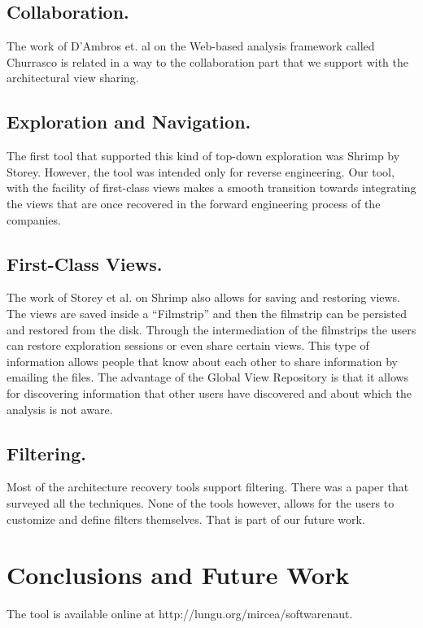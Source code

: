 \documentclass[preprint,12pt]{elsarticle}
\begin{document}
\subsection {Collaboration.} The work of D’Ambros et. al on the Web-based analysis framework called Churrasco is related in a way to the collaboration part that we support with the architectural view sharing. 

\subsection {Exploration and Navigation.} The first tool that supported this kind of top-down exploration was Shrimp by Storey. However, the tool was intended only for reverse engineering. Our tool, with the facility of first-class views makes a smooth transition towards integrating the views that are once recovered in the forward engineering process of the companies.

\subsection {First-Class Views.} The work of Storey et al. on Shrimp also allows for saving and restoring views. The views are saved inside a “Filmstrip” and then the filmstrip can be persisted and restored from the disk. Through the intermediation of the filmstrips the users can restore exploration sessions or even share certain views. This type of information allows people that know about each other to share information by emailing the files. The advantage of the Global View Repository is that it allows for discovering information that other users have discovered and about which the analysis is not aware. 

\subsection {Filtering.} Most of the architecture recovery tools support filtering. There was a paper that surveyed all the techniques. None of the tools however, allows for the users to customize and define filters themselves. That is part of our future work. 


\section {Conclusions and Future Work}
\label {sec:conc}
The tool is available online at http://lungu.org/mircea/softwarenaut.
\end{document}
